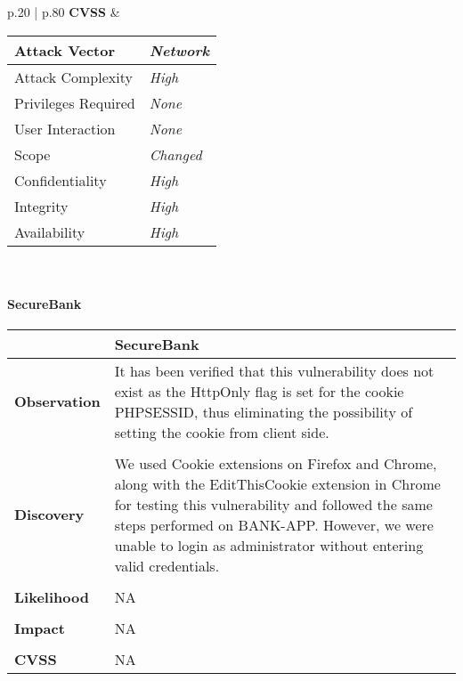 \begin{longtable*}{p{.20\textwidth} | p{.80\textwidth}}
    \textbf{CVSS} &
      \begin{tabular}{| l | l |}
      \hline
      Attack Vector		& \textit{Network}\\
      \hline
      Attack Complexity	& \textit{High} \\
      \hline
      Privileges Required & \textit{None} \\
      \hline
      User Interaction	& \textit{None} \\
      \hline
      Scope		& \textit{Changed} \\
      \hline
      Confidentiality	& \textit{High} \\
      \hline
      Integrity		& \textit{High} \\
      \hline
      Availability		& \textit{High} \\
      \hline
      \end{tabular}
    \\
    \hline
\end{longtable*}
\paragraph{SecureBank} \mbox{}
\begin{longtable*}{p{.20\textwidth} | p{.80\textwidth}}
    \hline
    & \textbf{SecureBank} \\
    \hline
    \textbf{Observation} &
       It has been verified that this vulnerability does not exist as the HttpOnly flag is set for the cookie PHPSESSID, thus eliminating the possibility of setting the cookie from client side.
    \\\\
    \textbf{Discovery} &
    We used Cookie extensions on Firefox and Chrome, along with the EditThisCookie extension in Chrome for testing this vulnerability and followed the same steps performed on BANK-APP. However, we were unable to login as administrator without entering valid credentials.
    \\\\
    \textbf{Likelihood} &
        NA
    \\\\
    \textbf{Impact} &
        NA
    \\\\
    \textbf{CVSS} &
        NA
    \\
    \hline
\end{longtable*}
\clearpage